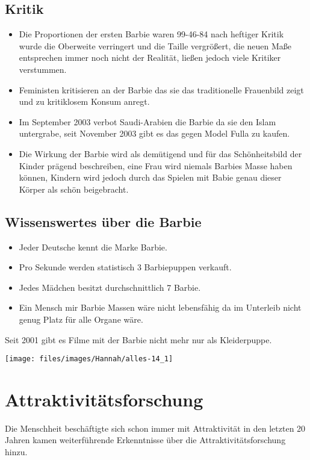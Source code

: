 \subsection{Kritik}
\begin{itemize}
	\item Die Proportionen der ersten Barbie waren 99-46-84 nach heftiger Kritik wurde die
		Oberweite verringert und die Taille vergrößert, die neuen Maße entsprechen immer noch
		nicht der Realität, ließen jedoch viele Kritiker verstummen.
	\item Feministen kritisieren an der Barbie das sie das traditionelle Frauenbild zeigt und zu
		kritiklosem Konsum anregt.
	\item Im September 2003 verbot Saudi-Arabien die Barbie da sie den Islam untergrabe, seit
		November 2003 gibt es das gegen Model Fulla zu kaufen.
	\item Die Wirkung der Barbie wird als demütigend und für das Schönheitsbild der Kinder prägend
		beschreiben, eine Frau wird niemals Barbies Masse haben können, Kindern wird jedoch durch das
		Spielen mit Babie genau dieser Körper als schön beigebracht.
\end{itemize}

\subsection{Wissenswertes über die Barbie}
\begin{itemize}
	\item Jeder Deutsche kennt die Marke Barbie.
	\item Pro Sekunde werden statistisch 3 Barbiepuppen verkauft.
	\item Jedes Mädchen besitzt durchschnittlich 7 Barbie.
	\item Ein Mensch mir Barbie Massen wäre nicht lebensfähig da im Unterleib nicht genug Platz
		für alle Organe wäre.
\end{itemize}

Seit 2001 gibt es Filme mit der Barbie nicht mehr nur als Kleiderpuppe.

\begin{figurewrapper}
	\texttt{[image: files/images/Hannah/alles-14\_1]}%
\end{figurewrapper}

\section{Attraktivitätsforschung}
Die Menschheit beschäftigte sich schon immer mit Attraktivität in den letzten 20 Jahren kamen
weiterführende Erkenntnisse über die Attraktivitätsforschung hinzu.

